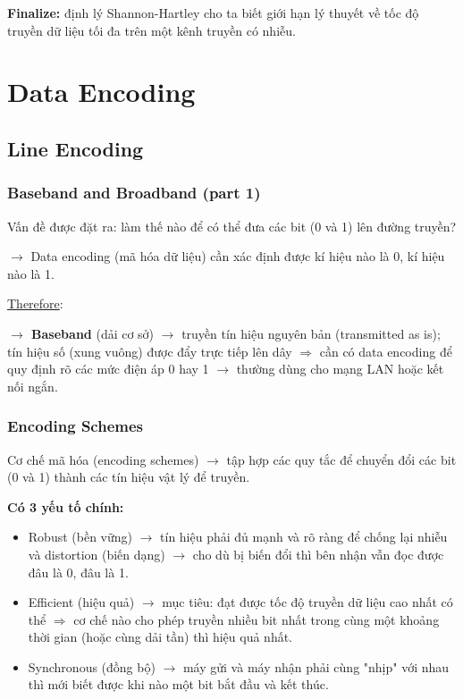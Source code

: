 \noindent
\textbf{Finalize:} định lý Shannon-Hartley cho ta biết giới hạn lý thuyết về tốc độ truyền dữ liệu tối đa trên một kênh truyền có nhiễu.
\medskip


\section{Data Encoding}

\subsection{Line Encoding}

\subsubsection{Baseband and Broadband (part 1)}

\noindent
Vấn đề được đặt ra: làm thế nào để có thể đưa các bit (0 và 1) lên đường truyền?

$\rightarrow$ Data encoding (mã hóa dữ liệu) cần xác định được kí hiệu nào là 0, kí hiệu nào là 1.
\medskip

\noindent
\underline{Therefore}:

\textbf{$\rightarrow$ Baseband} (dải cơ sở) $\rightarrow$ truyền tín hiệu nguyên bản (transmitted as is); tín hiệu số (xung vuông) được đẩy trực tiếp lên dây $\Rightarrow$ cần có data encoding để quy định rõ các mức điện áp 0 hay 1 $\rightarrow$ thường dùng cho mạng LAN hoặc kết nối ngắn.
\medskip

\subsubsection{Encoding Schemes}

\noindent
Cơ chế mã hóa (encoding schemes) $\rightarrow$ tập hợp các quy tắc để chuyển đổi các bit (0 và 1) thành các tín hiệu vật lý để truyền.
\medskip

\noindent
\textbf{Có 3 yếu tố chính:}

\begin{itemize}
    \item Robust (bền vững) $\rightarrow$ tín hiệu phải đủ mạnh và rõ ràng để chống lại nhiễu và distortion (biến dạng) $\rightarrow$ cho dù bị biến đổi thì bên nhận vẫn đọc được đâu là 0, đâu là 1.
    \item Efficient (hiệu quả) $\rightarrow$ mục tiêu: đạt được tốc độ truyền dữ liệu cao nhất có thể $\Rightarrow$ cơ chế nào cho phép truyền nhiều bit nhất trong cùng một khoảng thời gian (hoặc cùng dải tần) thì hiệu quả nhất.
    \item Synchronous (đồng bộ) $\rightarrow$ máy gửi và máy nhận phải cùng "nhịp" với nhau thì mới biết được khi nào một bit bắt đầu và kết thúc.
\end{itemize}

